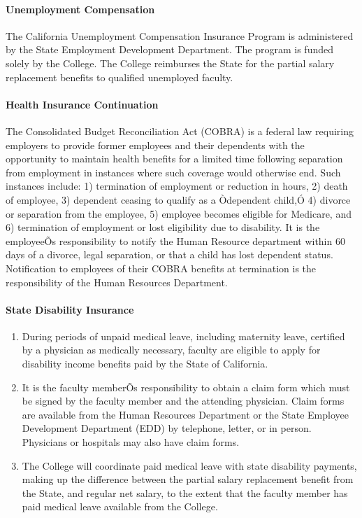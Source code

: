 \documentclass[letterpaper, 11pt]{article}
\begin{document}
			\paragraph{Unemployment Compensation}
				The California Unemployment Compensation Insurance Program is administered by the State Employment Development Department.  The program is funded solely by the College. The College reimburses the State for the partial salary replacement benefits to qualified unemployed faculty.
			\paragraph{Health Insurance Continuation}
				The Consolidated Budget Reconciliation Act (COBRA) is a federal law requiring employers to provide former employees and their dependents with the opportunity to maintain health benefits for a limited time following separation from employment in instances where such coverage would otherwise end.  Such instances include:  1) termination of employment or reduction in hours, 2) death of employee, 3) dependent ceasing to qualify as a Òdependent child,Ó 4) divorce or separation from the employee, 5) employee becomes eligible for Medicare, and 6) termination of employment or lost eligibility due to disability.  It is the employeeÕs responsibility to notify the Human Resource department within 60 days of a divorce, legal separation, or that a child has lost dependent status.  Notification to employees of their COBRA benefits at termination is the responsibility of the Human Resources Department.
			\paragraph{State Disability Insurance}
				\begin{enumerate}[label=\alph*)]
					\item{During periods of unpaid medical leave, including maternity leave, certified by a physician as medically necessary, faculty are eligible to apply for disability income benefits paid by the State of California.}
					\item{It is the faculty memberÕs responsibility to obtain a claim form which must be signed by the faculty member and the attending physician.  Claim forms are available from the Human Resources Department or the State Employee Development Department (EDD) by telephone, letter, or in person.  Physicians or hospitals may also have claim forms.}
					\item{The College will coordinate paid medical leave with state disability payments, making up the difference between the partial salary replacement benefit from the State, and regular net salary, to the extent that the faculty member has paid medical leave available from the College.}
				\end{enumerate}
\end{document}
